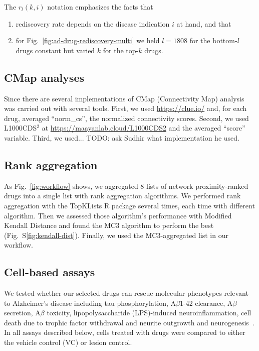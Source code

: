 \documentclass[letterpaper]{article}
\begin{document}
The $r_l(k, i)$ notation emphasizes the facts that
\begin{enumerate}
  \item rediscovery rate depends on the disease indication $i$ at hand, and
    that
  \item for
    Fig.~\ref{fig:ad-drug-rediscovery-multi}
    we held $l=1808$ for the bottom-$l$ drugs constant but varied $k$ for the
    top-$k$ drugs.
\end{enumerate}

\subsection{CMap analyses}

Since there are several implementations of CMap (Connectivity Map) analysis was carried out with several tools.  First, we used
\url{https://clue.io/} \citep{Lamb2006} and, for each drug, averaged
``norm\_cs'',
the normalized connectivity scores.  Second, we used L1000CDS$^2$ at
\url{https://maayanlab.cloud/L1000CDS2} and the averaged ``score'' variable.
Third, we used... TODO: ask Sudhir what implementation he used.

\subsection{Rank aggregation}

As Fig.~\ref{fig:workflow} shows, we aggregated 8 lists of network
proximity-ranked drugs into a single list with rank aggregation algorithms.
We performed rank aggregation with the TopKLists R package
several times, each time with different algorithm.  Then we assessed those
algorithm's performance with Modified Kendall Distance and found the MC3
algorithm to perform the best (Fig.~S\ref{fig:kendall-dist}).  Finally, we
used the MC3-aggregated list in our workflow.

\subsection{Cell-based assays}

We tested whether our selected drugs can rescue molecular phenotypes relevant
to Alzheimer's disease including tau phosphorylation, A$\beta$1-42 clearance,
A$\beta$ secretion, A$\beta$ toxicity, lipopolysaccharide (LPS)-induced
neuroinflammation, cell death due to trophic factor withdrawal and neurite
outgrowth and neurogenesis~\citep{Varma2020,Desai2022a}. In all assays
described below, cells treated with drugs were compared to either the vehicle
control (VC) or lesion control.
\end{document}
